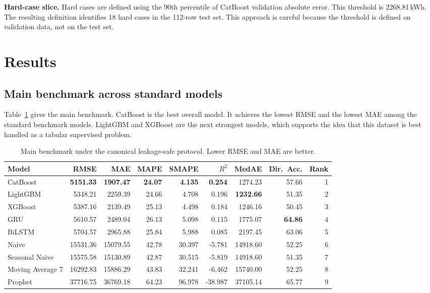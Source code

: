 \documentclass[conference]{IEEEtran}
\begin{document}
\textbf{Hard-case slice.} Hard cases are defined using the 90th percentile of CatBoost validation absolute error. This threshold is 2268.81\,kWh. The resulting definition identifies 18 hard cases in the 112-row test set. This approach is careful because the threshold is defined on validation data, not on the test set.

\section{Results}
\subsection{Main benchmark across standard models}
Table~\ref{tab:main_benchmark} gives the main benchmark. CatBoost is the best overall model. It achieves the lowest RMSE and the lowest MAE among the standard benchmark models. LightGBM and XGBoost are the next strongest models, which supports the idea that this dataset is best handled as a tabular supervised problem.

\begin{table}[t]
\caption{Main benchmark under the canonical leakage-safe protocol. Lower RMSE and MAE are better.}
\label{tab:main_benchmark}
\centering
\begin{tabular}{lrrrrrrrr}
\toprule
\textbf{Model} & \textbf{RMSE} & \textbf{MAE} & \textbf{MAPE} & \textbf{SMAPE} & \textbf{$R^2$} & \textbf{MedAE} & \textbf{Dir.\ Acc.} & \textbf{Rank} \\
\midrule
CatBoost & \textbf{5151.33} & \textbf{1907.47} & \textbf{24.07} & \textbf{4.135} & \textbf{0.254} & 1274.23 & 57.66 & 1 \\
LightGBM & 5348.21 & 2259.39 & 24.66 & 4.708 & 0.196 & \textbf{1232.66} & 51.35 & 2 \\
XGBoost & 5387.16 & 2139.49 & 25.13 & 4.498 & 0.184 & 1246.16 & 50.45 & 3 \\
GRU & 5610.57 & 2489.04 & 26.13 & 5.098 & 0.115 & 1775.07 & \textbf{64.86} & 4 \\
BiLSTM & 5704.57 & 2965.88 & 25.84 & 5.988 & 0.085 & 2197.45 & 63.06 & 5 \\
Naive & 15531.36 & 15079.55 & 42.78 & 30.397 & -5.781 & 14918.60 & 52.25 & 6 \\
Seasonal Naive & 15575.58 & 15130.89 & 42.87 & 30.515 & -5.819 & 14918.60 & 51.35 & 7 \\
Moving Average 7 & 16292.83 & 15886.29 & 43.83 & 32.241 & -6.462 & 15740.00 & 52.25 & 8 \\
Prophet & 37716.75 & 36769.18 & 64.23 & 96.978 & -38.987 & 37105.14 & 65.77 & 9 \\
\bottomrule
\end{tabular}
\end{table}
\end{document}
